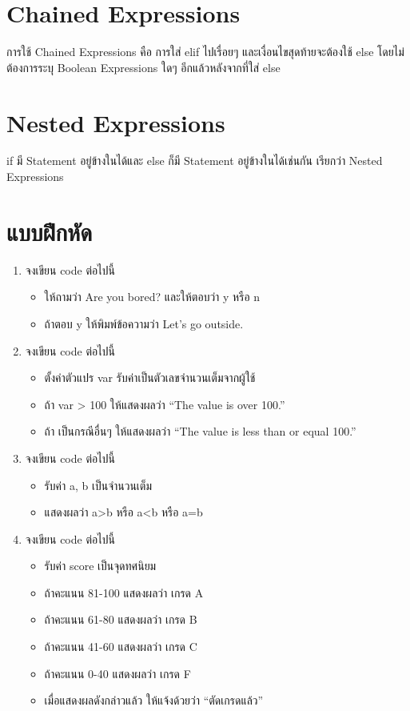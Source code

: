 \section{Chained Expressions}

การใช้ Chained Expressions คือ การใส่ elif ไปเรื่อยๆ และเงื่อนไขสุดท้ายจะต้องใช้ else โดยไม่ต้องการระบุ Boolean Expressions ใดๆ อีกแล้วหลังจากที่ใส่ else

\section{Nested Expressions}

if มี Statement อยู่ข้างในได้และ else ก็มี Statement อยู่ข้างในได้เช่นกัน เรียกว่า Nested Expressions

\section{แบบฝึกหัด}

\begin{enumerate} 
\item  จงเขียน code ต่อไปนี้
\begin{itemize}
\item ให้ถามว่า Are you bored? และให้ตอบว่า y หรือ n
\item ถ้าตอบ y ให้พิมพ์ข้อความว่า Let’s go outside.
\end{itemize}
\item จงเขียน code ต่อไปนี้
\begin{itemize}
\item ตั้งค่าตัวแปร var รับค่าเป็นตัวเลขจำนวนเต็มจากผู้ใช้
\item ถ้า var > 100 ให้แสดงผลว่า “The value is over 100.”
\item ถ้า เป็นกรณีอื่นๆ ให้แสดงผลว่า “The value is less than or equal 100.”
\end{itemize}
\item จงเขียน code ต่อไปนี้
\begin{itemize}
\item รับค่า a, b เป็นจำนวนเต็ม
\item แสดงผลว่า a>b หรือ a<b หรือ a=b
\end{itemize}
\item จงเขียน code ต่อไปนี้
\begin{itemize}
\item รับค่า score เป็นจุดทศนิยม
\item ถ้าคะแนน 81-100 แสดงผลว่า เกรด A
\item ถ้าคะแนน 61-80  แสดงผลว่า เกรด B
\item ถ้าคะแนน 41-60 แสดงผลว่า เกรด C
\item ถ้าคะแนน 0-40 แสดงผลว่า เกรด F
\item เมื่อแสดงผลดังกล่าวแล้ว ให้แจ้งด้วยว่า “ตัดเกรดแล้ว”
\end{itemize}
\end{enumerate}
